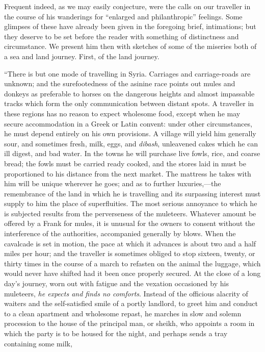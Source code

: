 Frequent
indeed, as we may easily conjecture, were the calls on our traveller in
the course of his wanderings for ``enlarged and philanthropic''
feelings. Some glimpses of these have already been given in the
foregoing brief, intimations; but they deserve to be set before the
reader with something of distinctness and circumstance. We present him
then with sketches of some of the miseries both of a sea and land
journey. First, of the land journey.

``There
is but one mode of travelling in Syria. Carriages and carriage-roads are
unknown; and the surefootedness of the asinine race points out mules and
donkeys as preferable to horses on the dangerous heights and almost
impassable tracks which form the only communication between distant
spots. A traveller in these regions has no reason to expect wholesome
food, except when he may secure accommodation in a Greek or Latin
convent: under other circumstances, he must depend entirely on his own
provisions. A village will yield him generally sour, and sometimes
fresh, milk, eggs, and \emph{dibash}, unleavened cakes which he can ill
digest, and bad water. In the towns he will purchase live fowls, rice,
and coarse bread; the fowls must be carried ready cooked, and the stores
laid in must be proportioned to his distance from the next market. The
mattress he takes with him will be unique wherever he goes; and as to
further luxuries,—the remembrance of the land in which he is
travelling and its surpassing interest must supply to him the place of
superfluities. The most serious annoyance to which he is subjected
results from the perverseness of the muleteers. Whatever amount be
offered by a Frank for mules, it is unusual for the owners to consent
without the interference of the authorities, accompanied generally by
blows. When the cavalcade is set in motion, the pace at which it
advances is about two and a half miles per hour; and the traveller is
sometimes obliged to stop sixteen, twenty, or thirty times in the course
of a march to refasten on the animal the luggage, which would never have
shifted had it been once properly secured. At the close of a long day's
journey, worn out with fatigue and the vexation occasioned by his
muleteers, \emph{he expects and finds no comforts}. Instead of the
officious alacrity of waiters and the self-satisfied smile of a portly
landlord, to greet him and conduct to a clean apartment and wholesome
repast, he marches in slow and solemn procession to the house of the
principal man, or sheikh, who appoints a room in which the party is to
be housed for the night, and perhaps sends a tray containing some milk,
